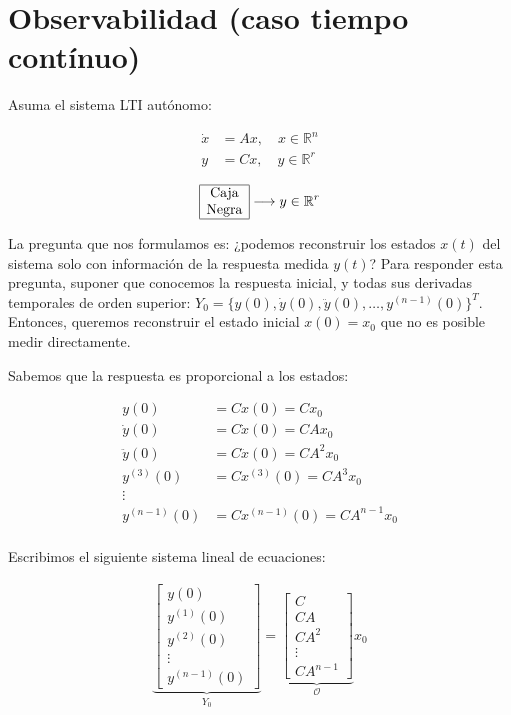 \section{Observabilidad (caso tiempo contínuo)}

Asuma el sistema LTI autónomo:

\begin{align*}
    \dot{x} &= Ax, \quad x\in\mathbb{R}^n\\
    y &= Cx, \quad y\in\mathbb{R}^r
\end{align*}

\begin{align*}
    \begin{array} {|c|}
  \hline \text{Caja}\\ 
  \text{Negra} \\
  \hline 
\end{array} \longrightarrow y\in\mathbb{R}^r
\end{align*}

La pregunta que nos formulamos es: ¿podemos reconstruir los estados $x(t)$ del sistema solo con información de la respuesta medida $y(t)$? Para responder esta pregunta, suponer que conocemos la respuesta inicial, y todas sus derivadas temporales de orden superior: $Y_0 = \{y(0),\dot{y}(0),\ddot{y}(0),\ldots,y^{(n-1)}(0)\}^{T}$. Entonces, queremos reconstruir el estado inicial $x(0)=x_0$ que no es posible medir directamente.

Sabemos que la respuesta es proporcional a los estados:

\begin{align*}
    y(0) &= C x(0) =C x_0 \\
    \dot{y}(0) &= C \dot{x}(0) =C Ax_0 \\
    \ddot{y}(0) &= C \ddot{x}(0) =C A^2 x_0 \\
    y^{(3)}(0) &= C  x^{(3)}(0) =C A^3 x_0 \\
   \vdots & \\
   y^{(n-1)}(0) &= C  x^{(n-1)}(0) =C A^{n-1} x_0 \\
\end{align*}

Escribimos el siguiente sistema lineal de ecuaciones:

\begin{align*}
    \underbrace{\begin{bmatrix}
        y(0) \\ y^{(1)}(0) \\ y^{(2)}(0) \\ \vdots \\ y^{(n-1)}(0)
    \end{bmatrix}}_{Y_0} =
    \underbrace{\begin{bmatrix} C \\ CA \\ CA^2 \\ \vdots \\ CA^{n-1} \end{bmatrix}}_{\mathcal{O}} x_0    
\end{align*}

